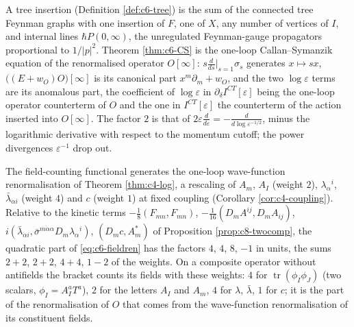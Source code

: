 \begin{remark}
A tree insertion (Definition \ref{def:c6-tree}) is the sum of the connected tree Feynman graphs with one insertion of $F$, one of $X$, any number of vertices of $I$, and internal lines $\hbar P(0,\infty)$, the unregulated Feynman-gauge propagators proportional to $1/|p|^2$. Theorem \ref{thm:c6-CS} is the one-loop Callan--Symanzik equation of the renormalised operator $O[\infty]$: $s\frac{d}{ds}\big|_{s=1}\sigma_s$ generates $x\mapsto sx$, $\big((E+w_O)O\big)[\infty]$ is its canonical part $x^m\partial_m+w_O$, and the two $\log\varepsilon$ terms are its anomalous part, the coefficient of $\log\varepsilon$ in $\partial_\delta I^{CT}[\varepsilon]$ being the one-loop operator counterterm of $O$ and the one in $I^{CT}[\varepsilon]$ the counterterm of the action inserted into $O[\infty]$. The factor $2$ is that of $2\varepsilon\frac{d}{d\varepsilon}=-\frac{d}{d\log\varepsilon^{-1/2}}$, minus the logarithmic derivative with respect to the momentum cutoff; the power divergences $\varepsilon^{-1}$ drop out.
\end{remark}

\begin{remark}
The field-counting functional generates the one-loop wave-function renormalisation of Theorem \ref{thm:c4-log}, a rescaling of $A_m$, $A_I$ (weight $2$), $\lambda_\alpha{}^i$, $\bar\lambda_{\dot\alpha i}$ (weight $4$) and $c$ (weight $1$) at fixed coupling (Corollary \ref{cor:c4-coupling}). Relative to the kinetic terms $-\tfrac18(F_{mn},F_{mn})$, $-\tfrac1{16}(D_mA^{ij},D_mA_{ij})$, $i(\bar\lambda_{\dot\alpha i},\bar\sigma^{m\dot\alpha\alpha}D_m\lambda_\alpha{}^i)$, $(D_mc,A^*_m)$ of Proposition \ref{prop:c8-twocomp}, the quadratic part of \eqref{eq:c6-fieldren} has the factors $4$, $4$, $8$, $-1$ in units, the sums $2+2$, $2+2$, $4+4$, $1-2$ of the weights. On a composite operator without antifields the bracket counts its fields with these weights: $4$ for $\operatorname{tr}(\phi_I\phi_J)$ (two scalars, $\phi_I=A^a_IT^a$), $2$ for the letters $A_I$ and $A_m$, $4$ for $\lambda$, $\bar\lambda$, $1$ for $c$; it is the part of the renormalisation of $O$ that comes from the wave-function renormalisation of its constituent fields.
\end{remark}

